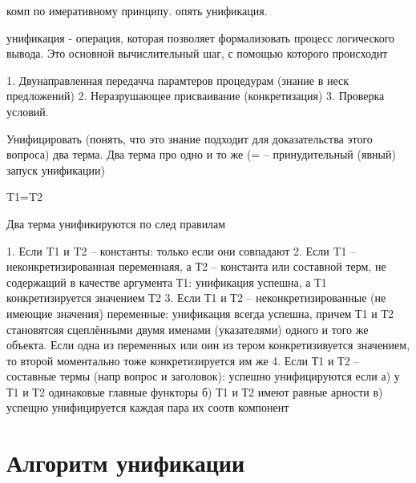 \documentclass[12pt]{report}
\begin{document}
комп по имеративному принципу. опять унификация.


унификация - операция, которая позволяет формализовать процесс логического вывода. Это основной вычислительный шаг, с помощью которого происходит

1. Двунаправленная передачча парамтеров процедурам (знание в неск предложений)
2. Неразрушающее присваивание (конкретизация) 
3. Проверка условий.


Унифицировать (понять, что это знание подходит для доказательства этого вопроса) два терма. Два терма про одно и то же (= -- принудительный (явный) запуск  унификации)

T1=T2


Два терма унификируются по след правилам 

1. Если T1 и T2 -- константы: только если они совпадают
2. Если T1 -- неконкретизированная переменнаяя, а Т2 -- константа или составной терм, не содержащий в качестве аргумента Т1: унификация успешна, а Т1 конкретизируется значением Т2
3. Если Т1 и Т2 -- неконкретизированные (не имеющие значения) переменные: унификация всегда успешна, причем Т1 и Т2 становятсяя сцеплёнными двумя именами (указателями) одного и того же объекта.
Если одна из переменных или оин из тером конкретизивуется значением, то второй моментально тоже конкретизируется им же
4. Если Т1 и Т2 -- составные термы (напр вопрос и заголовок): успешно унифицируются если
а) у Т1 и Т2 одинаковые главные функторы
б) Т1 и Т2 имеют равные арности
в) успещно унифицируется каждая пара их  соотв компонент

\section*{Алгоритм унификации}
\end{document}
